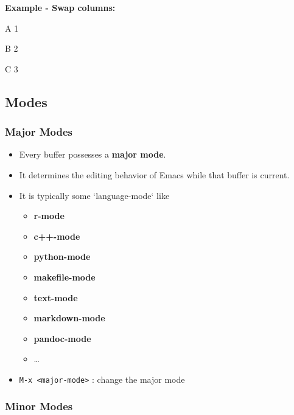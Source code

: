 \documentclass[11pt]{article}
\begin{document}
\textbf{Example - Swap columns:}

A   1

B   2

C   3

\subsection{Modes}
\label{sec:org40c4bcb}

\subsubsection{Major Modes}
\label{sec:org1fc9017}

\begin{itemize}
\item Every buffer possesses a \textbf{major mode}.

\item It determines the editing behavior of Emacs while that buffer is current.

\item It is typically some `language-mode` like

\begin{itemize}
\item \textbf{r-mode}

\item \textbf{c++-mode}

\item \textbf{python-mode}

\item \textbf{makefile-mode}

\item \textbf{text-mode}

\item \textbf{markdown-mode}

\item \textbf{pandoc-mode}

\item \ldots{}
\end{itemize}

\item \texttt{M-x <major-mode>} : change the major mode
\end{itemize}

\subsubsection{Minor Modes}
\label{sec:org451b2e6}
\end{document}
